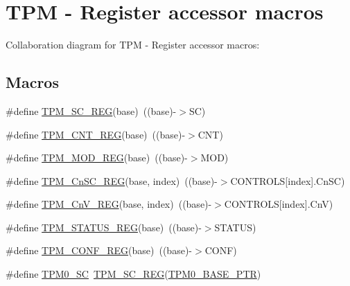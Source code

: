 \hypertarget{group___t_p_m___register___accessor___macros}{}\section{T\+PM -\/ Register accessor macros}
\label{group___t_p_m___register___accessor___macros}
Collaboration diagram for T\+PM -\/ Register accessor macros\+:
\subsection*{Macros}
\begin{DoxyCompactItemize}
\item 
\#define \hyperlink{group___t_p_m___register___accessor___macros_ga1f49370b3669ba7395db93597d3d5c4c}{T\+P\+M\+\_\+\+S\+C\+\_\+\+R\+EG}(base)~((base)-\/$>$SC)
\item 
\#define \hyperlink{group___t_p_m___register___accessor___macros_ga7f07766035aaf4ef8d6a789dc070bb8e}{T\+P\+M\+\_\+\+C\+N\+T\+\_\+\+R\+EG}(base)~((base)-\/$>$C\+NT)
\item 
\#define \hyperlink{group___t_p_m___register___accessor___macros_ga549fa5a6fe75d15bb21ae1a3925047c7}{T\+P\+M\+\_\+\+M\+O\+D\+\_\+\+R\+EG}(base)~((base)-\/$>$M\+OD)
\item 
\#define \hyperlink{group___t_p_m___register___accessor___macros_gaa96e657221c499960f64bc004e348b6c}{T\+P\+M\+\_\+\+Cn\+S\+C\+\_\+\+R\+EG}(base,  index)~((base)-\/$>$C\+O\+N\+T\+R\+O\+LS\mbox{[}index\mbox{]}.Cn\+SC)
\item 
\#define \hyperlink{group___t_p_m___register___accessor___macros_gaf87163e32c337d1f46724110a85e8ea2}{T\+P\+M\+\_\+\+Cn\+V\+\_\+\+R\+EG}(base,  index)~((base)-\/$>$C\+O\+N\+T\+R\+O\+LS\mbox{[}index\mbox{]}.CnV)
\item 
\#define \hyperlink{group___t_p_m___register___accessor___macros_ga685068c641303a062f9a8a0ba4f43fa2}{T\+P\+M\+\_\+\+S\+T\+A\+T\+U\+S\+\_\+\+R\+EG}(base)~((base)-\/$>$S\+T\+A\+T\+US)
\item 
\#define \hyperlink{group___t_p_m___register___accessor___macros_ga6c809a9824dbb88125be858cc3f362fd}{T\+P\+M\+\_\+\+C\+O\+N\+F\+\_\+\+R\+EG}(base)~((base)-\/$>$C\+O\+NF)
\item 
\#define \hyperlink{group___t_p_m___register___accessor___macros_ga99b670f23bdc4dba03402182f90d62f1}{T\+P\+M0\+\_\+\+SC}~\hyperlink{group___t_p_m___register___accessor___macros_ga1f49370b3669ba7395db93597d3d5c4c}{T\+P\+M\+\_\+\+S\+C\+\_\+\+R\+EG}(\hyperlink{group___t_p_m___peripheral_ga8ba6c6fb69345639750108c3289a24c4}{T\+P\+M0\+\_\+\+B\+A\+S\+E\+\_\+\+P\+TR})

\end{DoxyCompactItemize}
